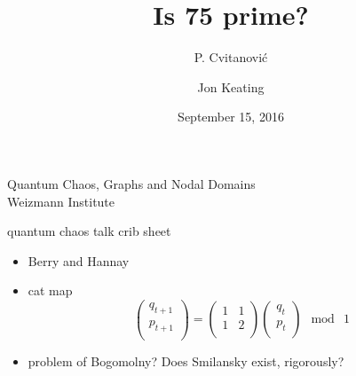 




\title{\huge Is 75 prime?}
\author{P. Cvitanovi\'c}
\author[Cvitanovi\'c]
{
  \textcolor{green!50!black}{
  {Jon Keating
  }	%
  }
}
\institute
{
Quantum Chaos, Graphs and Nodal Domains
\\
                Weizmann Institute
 }
\date{September 15, 2016}



\begin{frame}
  \titlepage
\end{frame}

\begin{frame}{quantum chaos talk crib sheet}
\begin{itemize}
  \item Berry and Hannay
  \item cat map
\[
\left (
\begin{array}{c}
q_{t+1} \\
p_{t+1} \\
\end{array}
\right ) =
\left (
\begin{array}{cc}
1 & 1 \\
1 & 2 \\
\end{array}
\right )
\left (
\begin{array}{c}
q_t \\
p_t \\
\end{array}
\right ) \mod\: 1
\] %
  \item problem of Bogomolny? Does Smilansky exist, rigorously?
\end{itemize}
\end{frame}

